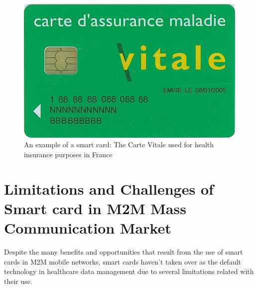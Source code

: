 \documentclass[12pt]{article}
\begin{document}
\begin{figure}[!t]
\centering
    \includegraphics[scale=0.3]{smart_card}
    \caption{An example of a smart card: The Carte Vitale used for health
insurance purposes in France}
    \label{smart_card_france}
\label{adhoc}

\end{figure}


\section{Limitations and Challenges of Smart card in M2M Mass Communication Market}
Despite the many benefits and opportunities that result
from the use of smart cards in M2M mobile networks, smart
cards haven’t taken over as the default technology in
healthcare data management due to several limitations
related with their use.
\end{document}
